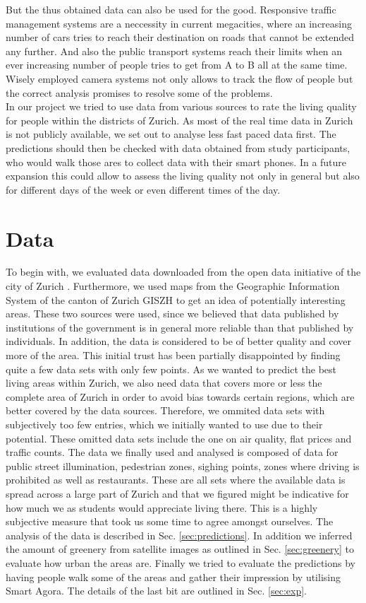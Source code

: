 \documentclass[letterpaper]{article}
\begin{document}
\indent But the thus obtained data can also be used for the good. Responsive traffic management systems are a neccessity in current megacities, where an increasing number of cars tries to reach their destination on roads that cannot be extended any further. And also the public transport systems reach their limits when an ever increasing number of people tries to get from A to B all at the same time. Wisely employed camera systems not only allows to track the flow of people but the correct analysis promises to resolve some of the problems.\\
\indent In our project we tried to use data from various sources to rate the living quality for people within the districts of Zurich. As most of the real time data in Zurich is not publicly available, we set out to analyse less fast paced data first. The predictions should then be checked with data obtained from study participants, who would walk those ares to collect data with their smart phones. In a future expansion this could allow to assess the living quality not only in general but also for different days of the week or even different times of the day.

\section{Data}\label{sec:data}
To begin with, we evaluated data downloaded from the open data initiative of the city of Zurich \cite{ZurichOD}.
Furthermore, we used maps from the Geographic Information System of the canton of Zurich GISZH \cite{GISZH} to get
an idea of potentially interesting areas.
These two sources were used, since we believed that data published by institutions of the government is in general
more reliable than that published by individuals. In addition, the data is considered to be of better quality and
cover more of the area. This initial trust has been partially disappointed by finding quite a few data sets with only few points.
As we wanted to predict the best living areas within Zurich, we also need data that covers more or less the complete area of Zurich
in order to avoid bias towards certain regions, which are better covered by the data sources. Therefore, we ommited data sets
with subjectively too few entries, which we initially wanted to use due to their potential. These omitted data sets include
the one on air quality, flat prices and traffic counts.
The data we finally used and analysed is composed of data for public street illumination, pedestrian zones, sighing points,
zones where driving is prohibited as well as restaurants. These are all sets where the available data is spread across
a large part of Zurich and that we figured might be indicative for how much we as students would appreciate living there.
This is a highly subjective measure that took us some time to agree amongst ourselves.
The analysis of the data is described in Sec. \ref{sec:predictions}. In addition we inferred the amount of greenery from satellite
images as outlined in Sec. \ref{sec:greenery} to evaluate how urban the areas are. Finally we tried to evaluate the predictions
by having people walk some of the areas and gather their impression by utilising Smart Agora. The details of the last bit
are outlined in Sec. \ref{sec:exp}.
\end{document}
